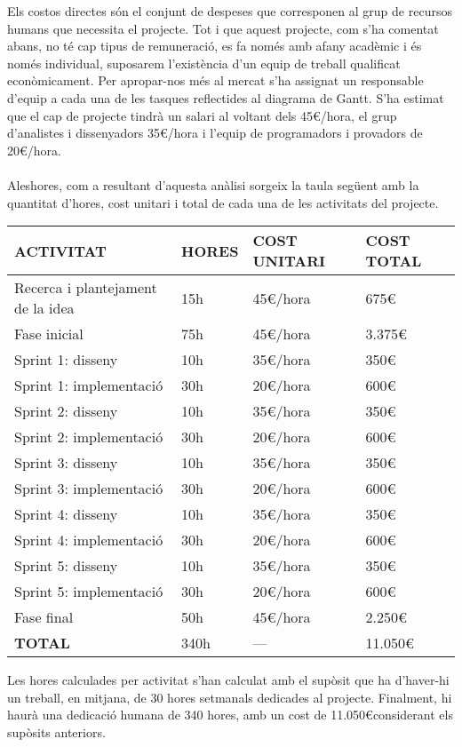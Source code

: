 Els costos directes són el conjunt de despeses que corresponen al grup de recursos humans que necessita el projecte. Tot i que aquest projecte, com s’ha comentat abans, no té cap tipus de remuneració, es fa només amb afany acadèmic i és només individual, suposarem l’existència d’un equip de treball qualificat econòmicament. Per apropar-nos més al mercat s’ha assignat un responsable d’equip a cada una de les tasques reflectides al diagrama de Gantt. S’ha estimat que el cap de projecte tindrà un salari al voltant dels 45\euro/hora, el grup d’analistes i dissenyadors 35\euro/hora i l’equip de programadors i provadors de 20\euro/hora.
\\\\
Aleshores, com a resultant d’aquesta anàlisi sorgeix la taula següent amb la quantitat d’hores, cost unitari i total de cada una de les activitats del projecte.
\\
\begin{center}
    \begin{tabular}{ | l | l | l | l |}
    \hline
	\textbf{ACTIVITAT}&\textbf{HORES}&\textbf{COST UNITARI}&\textbf{COST TOTAL} 		\\ \hline
    Recerca i plantejament de la idea 	& 15h 		& 45\euro/hora	& 675\euro			\\ \hline
    Fase inicial					 	& 75h 		& 45\euro/hora	& 3.375\euro		\\ \hline
    Sprint 1: disseny				 	& 10h 		& 35\euro/hora	& 350\euro			\\ \hline
    Sprint 1: implementació			 	& 30h 		& 20\euro/hora	& 600\euro			\\ \hline
	Sprint 2: disseny				 	& 10h 		& 35\euro/hora	& 350\euro			\\ \hline
    Sprint 2: implementació			 	& 30h 		& 20\euro/hora	& 600\euro			\\ \hline
    Sprint 3: disseny				 	& 10h 		& 35\euro/hora	& 350\euro			\\ \hline
    Sprint 3: implementació			 	& 30h 		& 20\euro/hora	& 600\euro			\\ \hline
    Sprint 4: disseny				 	& 10h 		& 35\euro/hora	& 350\euro			\\ \hline
   	Sprint 4: implementació			 	& 30h 		& 20\euro/hora	& 600\euro			\\ \hline
    Sprint 5: disseny				 	& 10h 		& 35\euro/hora	& 350\euro			\\ \hline
    Sprint 5: implementació			 	& 30h 		& 20\euro/hora	& 600\euro			\\ \hline
    Fase final						 	& 50h 		& 45\euro/hora	& 2.250\euro		\\ \hline
    \textbf{TOTAL}					 	& 340h 		& ---			& 11.050\euro		\\ 
    \hline
    \end{tabular}
\end{center}
Les hores calculades per activitat s’han calculat amb el supòsit que ha d’haver-hi un treball, en mitjana, de 30 hores setmanals dedicades al projecte. Finalment, hi haurà una dedicació humana de 340 hores, amb un cost de 11.050\euro\space considerant els supòsits anteriors.

